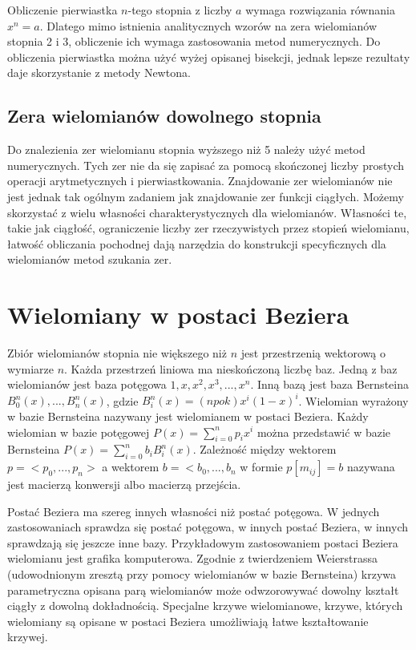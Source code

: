 \documentclass[11pt,a4paper,oneside]{report}
\begin{document}
Obliczenie pierwiastka $n$-tego stopnia z liczby $a$ wymaga rozwiązania równania $x^n = a$. Dlatego mimo istnienia analitycznych wzorów na zera wielomianów stopnia 2 i 3, obliczenie ich wymaga zastosowania metod numerycznych. Do obliczenia pierwiastka można użyć wyżej opisanej bisekcji, jednak lepsze rezultaty daje skorzystanie z metody Newtona.

\subsection{Zera wielomianów dowolnego stopnia}

Do znalezienia zer wielomianu stopnia wyższego niż 5 należy użyć metod numerycznych. Tych zer nie da się zapisać za pomocą skończonej liczby prostych operacji arytmetycznych i pierwiastkowania. Znajdowanie zer wielomianów nie jest jednak tak ogólnym zadaniem jak znajdowanie zer funkcji ciągłych. Możemy skorzystać z wielu własności charakterystycznych dla wielomianów. Własności te, takie jak ciągłość, ograniczenie liczby zer rzeczywistych przez stopień wielomianu, łatwość obliczania pochodnej dają narzędzia do konstrukcji specyficznych dla wielomianów metod szukania zer.

\section{Wielomiany w postaci Beziera}

Zbiór wielomianów stopnia nie większego niż $n$ jest przestrzenią wektorową o wymiarze $n$. Każda przestrzeń liniowa ma nieskończoną liczbę baz. Jedną z baz wielomianów jest baza potęgowa ${1,x,x^2,x^3,...,x^n}$. Inną bazą jest baza Bernsteina ${B^n_0(x),...,B^n_n(x)}$, gdzie $B^n_i(x) = (n po k)x^i(1-x)^i$. Wielomian wyrażony w bazie Bernsteina nazywany jest wielomianem w postaci Beziera. Każdy wielomian w bazie potęgowej $P(x) = \sum^n_{i=0}p_i x^i$ można przedstawić w bazie Bernsteina $P(x) = \sum^n_{i=0}b_i B^n_i(x)$. Zależność między wektorem $p = <p_0,...,p_n>$ a wektorem $b = <b_0, ..., b_n$ w formie $p [ m_{ij} ] = b$ nazywana jest macierzą konwersji albo macierzą przejścia.

Postać Beziera ma szereg innych własności niż postać potęgowa. W jednych zastosowaniach sprawdza się postać potęgowa, w innych postać Beziera, w innych sprawdzają się jeszcze inne bazy. Przykładowym zastosowaniem postaci Beziera wielomianu jest grafika komputerowa. Zgodnie z twierdzeniem Weierstrassa (udowodnionym zresztą przy pomocy wielomianów w bazie Bernsteina) krzywa parametryczna opisana parą wielomianów może odwzorowywać dowolny kształt ciągły z dowolną dokładnością. Specjalne krzywe wielomianowe, krzywe, których wielomiany są opisane w postaci Beziera umożliwiają łatwe kształtowanie krzywej.
\end{document}
